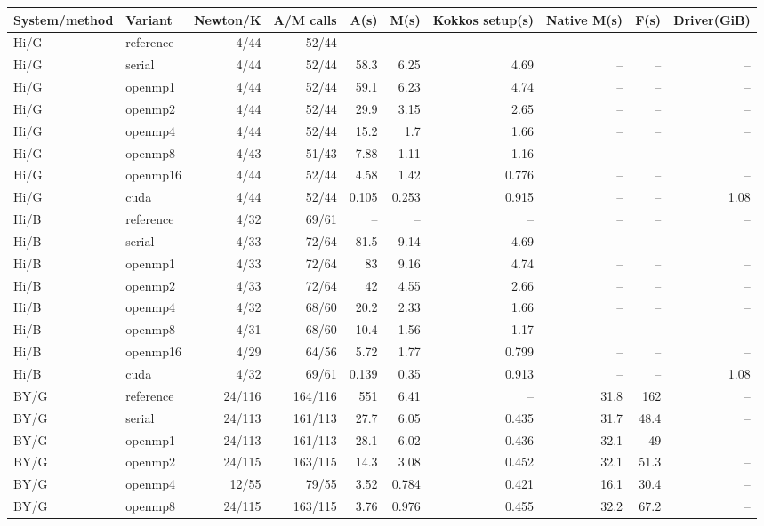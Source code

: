 \documentclass[11pt]{article}
\begin{document}
\scriptsize\begin{longtable}{llrrrrrrrr}
\toprule System/method & Variant & Newton/K & A/M calls & A(s) & M(s) & Kokkos setup(s) & Native M(s) & F(s) & Driver(GiB)\\
\midrule\endhead
Hi/G & reference & 4/44 & 52/44 & -- & -- & -- & -- & -- & --\\
Hi/G & serial & 4/44 & 52/44 & 58.3 & 6.25 & 4.69 & -- & -- & --\\
Hi/G & openmp1 & 4/44 & 52/44 & 59.1 & 6.23 & 4.74 & -- & -- & --\\
Hi/G & openmp2 & 4/44 & 52/44 & 29.9 & 3.15 & 2.65 & -- & -- & --\\
Hi/G & openmp4 & 4/44 & 52/44 & 15.2 & 1.7 & 1.66 & -- & -- & --\\
Hi/G & openmp8 & 4/43 & 51/43 & 7.88 & 1.11 & 1.16 & -- & -- & --\\
Hi/G & openmp16 & 4/44 & 52/44 & 4.58 & 1.42 & 0.776 & -- & -- & --\\
Hi/G & cuda & 4/44 & 52/44 & 0.105 & 0.253 & 0.915 & -- & -- & 1.08\\
Hi/B & reference & 4/32 & 69/61 & -- & -- & -- & -- & -- & --\\
Hi/B & serial & 4/33 & 72/64 & 81.5 & 9.14 & 4.69 & -- & -- & --\\
Hi/B & openmp1 & 4/33 & 72/64 & 83 & 9.16 & 4.74 & -- & -- & --\\
Hi/B & openmp2 & 4/33 & 72/64 & 42 & 4.55 & 2.66 & -- & -- & --\\
Hi/B & openmp4 & 4/32 & 68/60 & 20.2 & 2.33 & 1.66 & -- & -- & --\\
Hi/B & openmp8 & 4/31 & 68/60 & 10.4 & 1.56 & 1.17 & -- & -- & --\\
Hi/B & openmp16 & 4/29 & 64/56 & 5.72 & 1.77 & 0.799 & -- & -- & --\\
Hi/B & cuda & 4/32 & 69/61 & 0.139 & 0.35 & 0.913 & -- & -- & 1.08\\
BY/G & reference & 24/116 & 164/116 & 551 & 6.41 & -- & 31.8 & 162 & --\\
BY/G & serial & 24/113 & 161/113 & 27.7 & 6.05 & 0.435 & 31.7 & 48.4 & --\\
BY/G & openmp1 & 24/113 & 161/113 & 28.1 & 6.02 & 0.436 & 32.1 & 49 & --\\
BY/G & openmp2 & 24/115 & 163/115 & 14.3 & 3.08 & 0.452 & 32.1 & 51.3 & --\\
BY/G & openmp4 & 12/55 & 79/55 & 3.52 & 0.784 & 0.421 & 16.1 & 30.4 & --\\
BY/G & openmp8 & 24/115 & 163/115 & 3.76 & 0.976 & 0.455 & 32.2 & 67.2 & --\\

\end{longtable}
\end{document}
